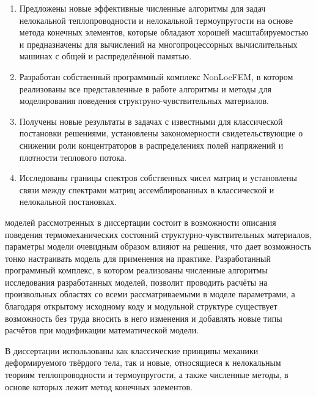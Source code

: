 {\novelty}
\begin{enumerate}[beginpenalty=10000] %
  \item Предложены новые эффективные численные алгоритмы для задач нелокальной теплопроводности и нелокальной термоупругости на основе метода конечных элементов, которые обладают хорошей масштабируемостью и предназначены для вычислений на многопроцессорных вычислительных машинах с общей и распределённой памятью.
  \item Разработан собственный программный комплекс NonLocFEM, в котором реализованы все представленные в работе алгоритмы и методы для моделирования поведения структруно-чувствительных материалов.
  \item Получены новые результаты в задачах с известными для классической постановки решениями, установлены закономерности свидетельствующие о снижении роли концентраторов в распределениях полей напряжений и плотности теплового потока.
  \item Исследованы границы спектров собственных чисел матриц и установлены связи между спектрами матриц ассемблированных в классической и нелокальной постановках.
\end{enumerate}

{\influence}
моделей рассмотренных в диссертации состоит в возможности описания поведения термомеханических состояний структурно-чувствительных материалов, параметры модели очевидным образом влияют на решения, что дает возможность тонко настраивать модель для применения на практике. Разработанный программный комплекс, в котором реализованы численные алгоритмы исследования разработанных моделей, позволит проводить расчёты на произвольных областях со всеми рассматриваемыми в моделе параметрами, а благодаря открытому исходному коду и модульной структуре существует возможность без труда вносить в него изменения и добавлять новые типы расчётов при модификации математической модели.

{\methods}
В диссертации использованы как классические принципы механики деформируемого твёрдого тела, так и новые, относящиеся к нелокальным теориям теплопроводности и термоупругости, а также численные методы, в основе которых лежит метод конечных элементов.

